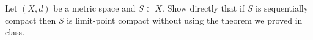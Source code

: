 \begin{problem}
  Let $(X, d)$ be a metric space and $S \subset X$.
  Show directly that if $S$ is sequentially compact
  then $S$ is limit-point compact without using the
  theorem we proved in class.
\end{problem}
\begin{answer}
  
\end{answer}
